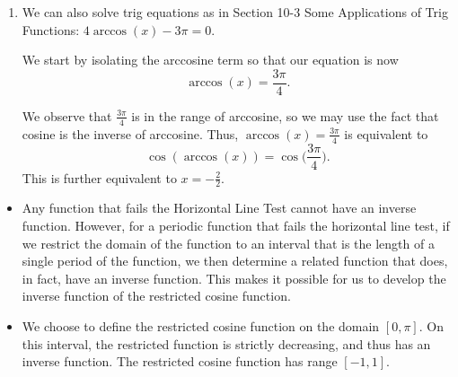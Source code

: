 \documentclass{ximera}
\begin{document}
\begin{example}
\begin{enumerate}
\begin{explanation}
\end{explanation}

\item We can also solve trig equations as in Section 10-3 Some Applications of Trig Functions: $4\arccos(x)-3\pi=0$.

\begin{explanation}
We start by isolating the arccosine term so that our equation is now
$$\arccos(x) = \frac{3\pi}{4}.$$

We observe that $\frac{3\pi}{4}$ is in the range of arccosine, so we may use the fact that cosine is the inverse of arccosine. Thus, $\arccos(x) = \frac{3\pi}{4}$ is equivalent to 
$$\cos(\arccos(x)) = \cos\bigg(\frac{3\pi}{4}\bigg).$$
%
This is further equivalent to $x = -\frac{2}{2}$.
\end{explanation}
%
\end{enumerate}
\end{example}



%


\begin{summary}
  \begin{itemize}
\item Any function that fails the Horizontal Line Test cannot have an inverse function.  However, for a periodic function that fails the horizontal line test, if we restrict the domain of the function to an interval that is the length of a single period of the function, we then determine a related function that does, in fact, have an inverse function.  This makes it possible for us to develop the inverse function of the restricted cosine function.
\item We choose to define the restricted cosine function on the domain $[0,\pi]$. On this interval, the restricted function is strictly decreasing, and thus has an inverse function.  The restricted cosine function has range $[-1,1]$. 
  \end{itemize}
\end{summary}
\end{document}
